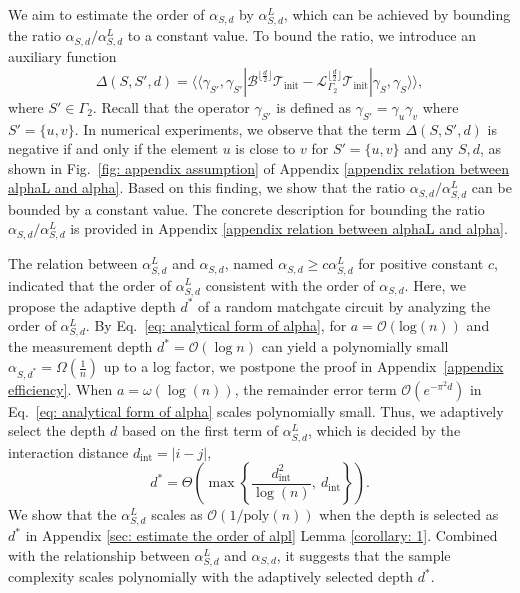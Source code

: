 \documentclass[showpacs,onecolumn,aps,prx,long bibliography,superscriptaddress,notitlepage]{revtex4-1}
\newcommand{\supket}[1]{|#1 \rangle\rangle}
\newcommand{\supbra}[1]{\langle\langle #1 |}
\newcommand{\cbra}[1]{\{ #1 \}}
\newcommand{\pbra}[1]{\left( #1 \right)}
\newcommand{\Tcal}{\mathcal{T}}
\begin{document}
We aim to estimate the order of $\alpha_{S,d}$ by $\alpha_{S,d}^L$, which can be achieved by bounding the ratio $\alpha_{S,d} /\alpha_{S,d}^L$ to a constant value. 
To bound the ratio, we introduce an auxiliary function
\begin{equation}
\label{eq: def del}
    \Delta(S,S',d) = \supbra{\gamma_{S' }, \gamma_{S'}} 
\mathcal{B}^{\lfloor \frac{d}{2}\rfloor} \Tcal_\text{init} -  \mathcal{L}_{\Gamma_2}^{\lfloor \frac{d}{2}\rfloor} \Tcal_\text{init} \supket{\gamma_S, \gamma_S},
\end{equation}
where $S'\in\Gamma_2$. 
Recall that the operator $\gamma_{S'}$ is defined as $\gamma_{S'} = \gamma_{u} \gamma_{v}$ where $S' = \cbra{u,v}$. 
In numerical experiments, we observe that the term $\Delta(S, S',d)$ is negative if and only if the element $u$ is close to $v$ for $S'=\cbra{u,v}$ and any $S,d$, as shown in Fig.~\ref{fig: appendix assumption} of Appendix \ref{appendix relation between alphaL and alpha}. Based on this finding, we show that the ratio $\alpha_{S,d} /\alpha_{S,d}^L$ can be bounded by a constant value. The concrete description for bounding the ratio $\alpha_{S,d} /\alpha_{S,d}^L$ is provided in Appendix \ref{appendix relation between alphaL and alpha}.


The relation between $\alpha^L_{S,d}$ and $\alpha_{S,d}$, named $\alpha_{S,d}\geq c\alpha^L_{S,d}$ for positive constant $c$, indicated that the order of $\alpha_{S,d}^L$ consistent with the order of $\alpha_{S,d}$. Here, we propose the adaptive depth $d^\ast$ of a random matchgate circuit by analyzing the order of $\alpha^L_{S,d}$. 
By Eq.~\eqref{eq: analytical form of alpha}, for $ a = \mathcal{O}(\mathrm{log}(n)) $ and the measurement depth $ d^\ast = \mathcal{O} (\log n)$ can yield a polynomially small $ \alpha_{S,d^*} = \Omega\left(\frac{1}{n} \right)$ up to a log factor, we postpone the proof in Appendix~\ref{appendix efficiency}. 
{When $a=\omega\pbra{\log(n)}$, the remainder error term $\mathcal{O}(e^{-\pi^2 d})$ in Eq.~\eqref{eq: analytical form of alpha} scales polynomially small. }
Thus, we adaptively select the depth $d$ based on the first term of $\alpha_{S,d}^L$, which is decided by the interaction distance $d_{\text{int}} = |i-j|$,
\begin{equation}
    d^\ast = \Theta\left( \max\left\{\frac{d_{\text{int}}^2}{\log(n)}, ~d_{\text{int}}  \right\} \right).
\end{equation}
We show that the $\alpha_{S,d}^L$ scales as $\mathcal{O}(1/\text{poly}(n))$ when the depth is selected as $d^\ast$ in Appendix \ref{sec: estimate the order of alpl} Lemma \ref{corollary: 1}. Combined with the relationship between $\alpha^L_{S,d}$ and $\alpha_{S,d}$, it suggests that the sample complexity scales polynomially with the adaptively selected depth $d^\ast$.
\end{document}
